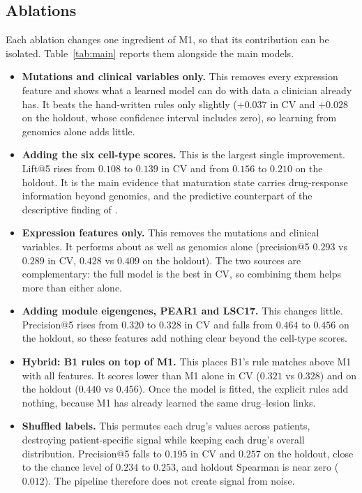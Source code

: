 \documentclass[11pt,logo,nonumbering]{preprint}
\begin{document}
\subsection{Ablations}\label{sec:ablations}
Each ablation changes one ingredient of M1, so that its contribution can be isolated. Table~\ref{tab:main} reports them alongside the main models.
\begin{itemize}
 \item \textbf{Mutations and clinical variables only.} This removes every expression feature and shows what a learned model can do with data a clinician already has. It beats the hand-written rules only slightly ($+0.037$ in CV and $+0.028$ on the holdout, whose confidence interval includes zero), so learning from genomics alone adds little.
 \item \textbf{Adding the six cell-type scores.} This is the largest single improvement. Lift@5 rises from $0.108$ to $0.139$ in CV and from $0.156$ to $0.210$ on the holdout. It is the main evidence that maturation state carries drug-response information beyond genomics, and the predictive counterpart of the descriptive finding of \citet{bottomly2022}.
 \item \textbf{Expression features only.} This removes the mutations and clinical variables. It performs about as well as genomics alone (precision@5 $0.293$ vs $0.289$ in CV, $0.428$ vs $0.409$ on the holdout). The two sources are complementary: the full model is the best in CV, so combining them helps more than either alone.
 \item \textbf{Adding module eigengenes, PEAR1 and LSC17.} This changes little. Precision@5 rises from $0.320$ to $0.328$ in CV and falls from $0.464$ to $0.456$ on the holdout, so these features add nothing clear beyond the cell-type scores.
 \item \textbf{Hybrid: B1 rules on top of M1.} This places B1's rule matches above M1 with all features. It scores lower than M1 alone in CV ($0.321$ vs $0.328$) and on the holdout ($0.440$ vs $0.456$). Once the model is fitted, the explicit rules add nothing, because M1 has already learned the same drug--lesion links.
 \item \textbf{Shuffled labels.} This permutes each drug's values across patients, destroying patient-specific signal while keeping each drug's overall distribution. Precision@5 falls to $0.195$ in CV and $0.257$ on the holdout, close to the chance level of $0.234$ to $0.253$, and holdout Spearman is near zero ($0.012$). The pipeline therefore does not create signal from noise.
\end{itemize}
\end{document}
